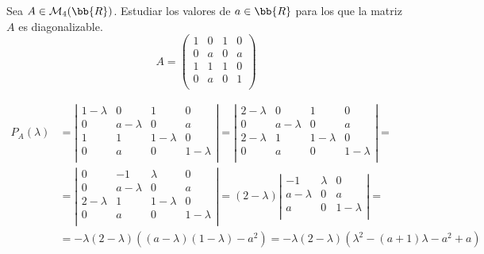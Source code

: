 \begin{ejercicio}
    Sea $A\in \mathcal{M}_4(\bb{R})$. Estudiar los valores de $a\in\bb{R}$ para los que la matriz $A$ es diagonalizable.
    \begin{equation*}
        A = \left( \begin{array}{cccc}
            1 & 0 & 1 & 0 \\
            0 & a & 0 & a \\
            1 & 1 & 1 & 0 \\
            0 & a & 0 & 1 \\
        \end{array}\right)
    \end{equation*}

    \begin{equation*}\begin{split}
        P_A(\lambda) & = \left|\begin{array}{cccc}
            1-\lambda & 0 & 1 & 0 \\
            0 & a-\lambda & 0 & a \\
            1 & 1 & 1-\lambda & 0 \\
            0 & a & 0 & 1-\lambda \\
        \end{array} \right| = \left|\begin{array}{cccc}
            2-\lambda & 0 & 1 & 0 \\
            0 & a-\lambda & 0 & a \\
            2-\lambda & 1 & 1-\lambda & 0 \\
            0 & a & 0 & 1-\lambda \\
        \end{array} \right| = \\
        & = \left|\begin{array}{cccc}
            0 & -1 & \lambda & 0 \\
            0 & a-\lambda & 0 & a \\
            2-\lambda & 1 & 1-\lambda & 0 \\
            0 & a & 0 & 1-\lambda \\
        \end{array} \right|
        = (2-\lambda) \left|\begin{array}{ccc}
            -1 & \lambda & 0 \\
            a-\lambda & 0 & a \\
            a & 0 & 1-\lambda \\
        \end{array} \right| = \\
        & = -\lambda(2-\lambda)((a-\lambda)(1-\lambda)-a^2) = -\lambda(2-\lambda)(\lambda^2-(a+1)\lambda-a^2+a)
    \end{split}\end{equation*}


\end{ejercicio}
